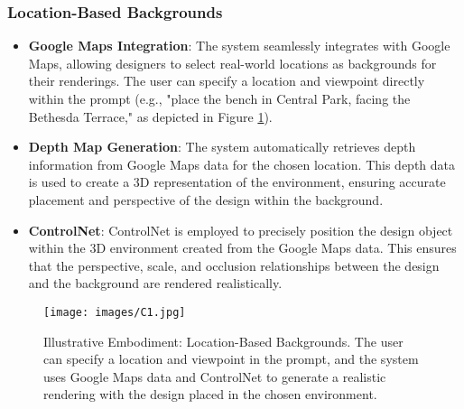 \documentclass{article}
\begin{document}
\subsubsection{Location-Based Backgrounds}
\begin{itemize}
\item \textbf{Google Maps Integration}: The system seamlessly integrates with Google Maps, allowing designers to select real-world locations as backgrounds for their renderings. The user can specify a location and viewpoint directly within the prompt (e.g., "place the bench in Central Park, facing the Bethesda Terrace," as depicted in Figure \ref{fig:location-based-background}).
\item \textbf{Depth Map Generation}: The system automatically retrieves depth information from Google Maps data for the chosen location. This depth data is used to create a 3D representation of the environment, ensuring accurate placement and perspective of the design within the background.
\item \textbf{ControlNet}: ControlNet is employed to precisely position the design object within the 3D environment created from the Google Maps data. This ensures that the perspective, scale, and occlusion relationships between the design and the background are rendered realistically.
\end{itemize}

\begin{figure}
\centering
\texttt{[image: images/C1.jpg]}
\caption{Illustrative Embodiment: Location-Based Backgrounds. The user can specify a location and viewpoint in the prompt, and the system uses Google Maps data and ControlNet to generate a realistic rendering with the design placed in the chosen environment.}
\label{fig:location-based-background}
\end{figure}
\end{document}
